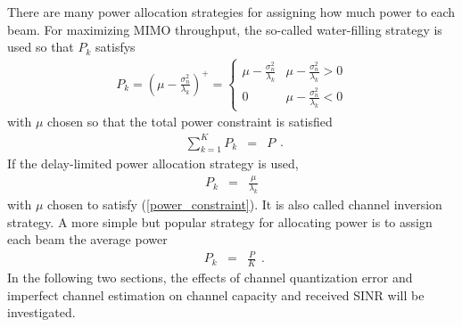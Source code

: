 \documentclass[10pt,fleqn, twocolumn]{IEEEtran}
\begin{document}
There are many power allocation strategies for assigning how much
power to each beam. For maximizing MIMO throughput, the so-called
water-filling strategy is used so that $P_{k}$ satisfys
\begin{equation}
\begin{array}{l}
P_{k}=\left(\mu-\frac{\sigma_{n}^2}{\lambda_{k}}\right)^{+}=
\begin{cases}
\mu-\frac{\sigma_{n}^2}{\lambda_{k}} & \mu-\frac{\sigma_{n}^2}{\lambda_{k}} >0 \\
0 & \mu-\frac{\sigma_{n}^2}{\lambda_{k}} < 0
\end{cases}
\end{array}
\end{equation}
with $\mu$ chosen so that the total power constraint is satisfied
\begin{equation}
\begin{array}{rcl}
\sum\limits_{k=1}^{K}P_{k}&=&P
\end{array}.\label{power_constraint}
\end{equation}
\noindent If the delay-limited power allocation strategy is used,
\begin{equation}
\begin{array}{rcl}
P_{k}&=&\frac{\mu}{\lambda_{k}}
\end{array}
\end{equation}
with $\mu$ chosen to satisfy (\ref{power_constraint}). It is also
called channel inversion strategy. A more simple but popular
strategy for allocating power is to assign each beam the average
power
\begin{equation}
\begin{array}{rcl}
P_{k}&=&\frac{P}{K}
\end{array}.\label{P_aver}
\end{equation}
\noindent In the following two sections, the effects of channel
quantization error and imperfect channel estimation on channel
capacity and received SINR will be investigated.
\end{document}
